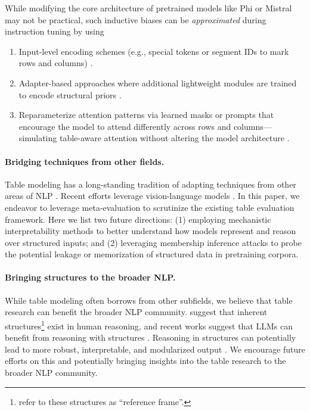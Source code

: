 \documentclass[11pt]{article}
\begin{document}
While modifying the core architecture of pretrained models like Phi or Mistral may not be practical, such inductive biases can be \textit{approximated} during instruction tuning by using

\begin{enumerate}
    \item Input-level encoding schemes (e.g., special tokens or segment IDs to mark rows and columns) \citep{herzig-etal-2020-tapas}.
    \item Adapter-based approaches where additional lightweight modules are trained to encode structural priors \citep{hu2023llm}.
    \item Reparameterize attention patterns via learned masks or prompts that encourage the model to attend differently across rows and columns—simulating table-aware attention without altering the model architecture \citep{lester2021power, li2021prefix}.
\end{enumerate}




\paragraph{Bridging techniques from other fields.}
Table modeling has a long-standing tradition of adapting techniques from other areas of NLP \citep{yin-etal-2020-tabert}. 
Recent efforts leverage vision-language models \citep{deng-etal-2024-tables, zheng-etal-2024-multimodal}.
In this paper, we endeavor to leverage meta-evaluation \citep{kobayashi2024revisiting, veuthey2025meqa} to scrutinize the existing table evaluation framework. 
Here we list two future directions: (1) employing mechanistic interpretability methods \citep{huben2024sparse} to better understand how models represent and reason over structured inputs; and (2) leveraging membership inference attacks \citep{shokri2017membership} to probe the potential leakage or memorization of structured data in pretraining corpora.


\paragraph{Bringing structures to the broader NLP.}
While table modeling often borrows from other subfields, we believe that table research can benefit the broader NLP community.
\citet{hawkins2021thousand} suggest that inherent structures\footnote{\citet{hawkins2021thousand} refer to these structures as ``reference frame''.} exist in human reasoning, and recent works suggest that LLMs can benefit from reasoning with structures \citep{sun2025table}.
Reasoning in structures can potentially lead to more robust, interpretable, and modularized output \citep{wang2024chainoftable}.
We encourage future efforts on this and potentially bringing insights into the table research to the broader NLP community.
\end{document}
